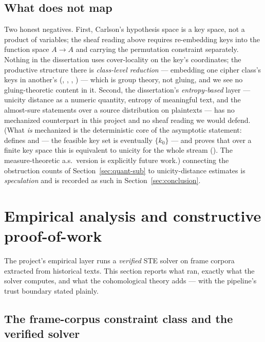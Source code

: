 \documentclass[11pt]{article}
\begin{document}
\subsection{What does not map}

Two honest negatives.  First, Carlson's hypothesis space is a key
space, not a product of variables; the sheaf reading above requires
re-embedding keys into the function space $A \to A$ and carrying the
permutation constraint separately.  Nothing in the dissertation uses
cover-locality on the key's coordinates; the productive structure
there is \emph{class-level reduction} --- embedding one cipher
class's keys in another's
(,
,
,
) --- which is group theory, not
gluing, and we see no gluing-theoretic content in it.  Second, the
dissertation's \emph{entropy-based} layer --- unicity distance as a
numeric quantity, entropy of meaningful text, and the almost-sure
statements over a source distribution on plaintexts --- has no
mechanized counterpart in this project and no sheaf reading we would
defend.  (What \emph{is} mechanized is the deterministic core of the
asymptotic statement:  defines
 and  --- the feasible key
set is eventually $\{k_0\}$ --- and proves that over a finite key
space this is equivalent to unicity for the whole stream
().  The measure-theoretic a.s.\
version is explicitly future work.) connecting the
obstruction counts of Section~\ref{sec:quant-sub} to
unicity-distance estimates is \emph{speculation} and is recorded as
such in Section~\ref{sec:conclusion}.

\section{Empirical analysis and constructive proof-of-work}
\label{sec:empirical}

The project's empirical layer runs a \emph{verified} STE solver on
frame corpora extracted from historical texts.  This section reports
what ran, exactly what the solver computes, and what the
cohomological theory adds --- with the pipeline's trust boundary
stated plainly.

\subsection{The frame-corpus constraint class and the verified
solver}
\end{document}
